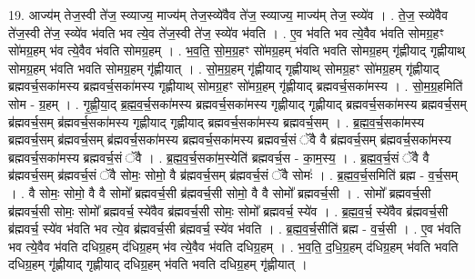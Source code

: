 \documentclass[17pt]{extarticle}
\begin{document}
19. आज्य॑म् तेज॒स्वी ते॑ज॒ स्व्याज्य॒ माज्य॑म् तेज॒स्व्ये॑वैव ते॑ज॒ स्व्याज्य॒ माज्य॑म् तेज॒ स्व्ये॑व । . ते॒ज॒ स्व्ये॑वैव ते॑ज॒स्वी ते॑ज॒ स्व्ये॑व भ॑वति भव त्ये॒व ते॑ज॒स्वी ते॑ज॒ स्व्ये॑व भ॑वति । . ए॒व भ॑वति भव त्ये॒वैव भ॑वति सोमग्र॒हꣳ सो॑मग्र॒हम् भ॑व त्ये॒वैव भ॑वति सोमग्र॒हम् । . भ॒व॒ति॒ सो॒म॒ग्र॒हꣳ सो॑मग्र॒हम् भ॑वति भवति सोमग्र॒हम् गृ॑ह्णीयाद् गृह्णीयाथ् सोमग्र॒हम् भ॑वति भवति सोमग्र॒हम् गृ॑ह्णीयात् । . सो॒म॒ग्र॒हम् गृ॑ह्णीयाद् गृह्णीयाथ् सोमग्र॒हꣳ सो॑मग्र॒हम् गृ॑ह्णीयाद् ब्रह्मवर्च॒सका॑मस्य ब्रह्मवर्च॒सका॑मस्य गृह्णीयाथ् सोमग्र॒हꣳ सो॑मग्र॒हम् गृ॑ह्णीयाद् ब्रह्मवर्च॒सका॑मस्य । . सो॒म॒ग्र॒हमिति॑ सोम - ग्र॒हम् । . गृ॒ह्णी॒या॒द् ब्र॒ह्म॒व॒र्च॒सका॑मस्य ब्रह्मवर्च॒सका॑मस्य गृह्णीयाद् गृह्णीयाद् ब्रह्मवर्च॒सका॑मस्य ब्रह्मवर्च॒सम् ब्र॑ह्मवर्च॒सम् ब्र॑ह्मवर्च॒सका॑मस्य गृह्णीयाद् गृह्णीयाद् ब्रह्मवर्च॒सका॑मस्य ब्रह्मवर्च॒सम् । . ब्र॒ह्म॒व॒र्च॒सका॑मस्य ब्रह्मवर्च॒सम् ब्र॑ह्मवर्च॒सम् ब्र॑ह्मवर्च॒सका॑मस्य ब्रह्मवर्च॒सका॑मस्य ब्रह्मवर्च॒सं ॅवै वै ब्र॑ह्मवर्च॒सम् ब्र॑ह्मवर्च॒सका॑मस्य ब्रह्मवर्च॒सका॑मस्य ब्रह्मवर्च॒सं ॅवै । . ब्र॒ह्म॒व॒र्च॒सका॑म॒स्येति॑ ब्रह्मवर्च॒स - का॒म॒स्य॒ । . ब्र॒ह्म॒व॒र्च॒सं ॅवै वै ब्र॑ह्मवर्च॒सम् ब्र॑ह्मवर्च॒सं ॅवै सोमः॒ सोमो॒ वै ब्र॑ह्मवर्च॒सम् ब्र॑ह्मवर्च॒सं ॅवै सोमः॑ । . ब्र॒ह्म॒व॒र्च॒समिति॑ ब्रह्म - व॒र्च॒सम् । . वै सोमः॒ सोमो॒ वै वै सोमो᳚ ब्रह्मवर्च॒सी ब्र॑ह्मवर्च॒सी सोमो॒ वै वै सोमो᳚ ब्रह्मवर्च॒सी । . सोमो᳚ ब्रह्मवर्च॒सी ब्र॑ह्मवर्च॒सी सोमः॒ सोमो᳚ ब्रह्मवर्च॒ स्ये॑वैव ब्र॑ह्मवर्च॒सी सोमः॒ सोमो᳚ ब्रह्मवर्च॒ स्ये॑व । . ब्र॒ह्म॒व॒र्च॒ स्ये॑वैव ब्र॑ह्मवर्च॒सी ब्र॑ह्मवर्च॒ स्ये॑व भ॑वति भव त्ये॒व ब्र॑ह्मवर्च॒सी ब्र॑ह्मवर्च॒ स्ये॑व भ॑वति । . ब्र॒ह्म॒व॒र्च॒सीति॑ ब्रह्म - व॒र्च॒सी । . ए॒व भ॑वति भव त्ये॒वैव भ॑वति दधिग्र॒हम् द॑धिग्र॒हम् भ॑व त्ये॒वैव भ॑वति दधिग्र॒हम् । . भ॒व॒ति॒ द॒धि॒ग्र॒हम् द॑धिग्र॒हम् भ॑वति भवति दधिग्र॒हम् गृ॑ह्णीयाद् गृह्णीयाद् दधिग्र॒हम् भ॑वति भवति दधिग्र॒हम् गृ॑ह्णीयात् । \newline
\end{document}
